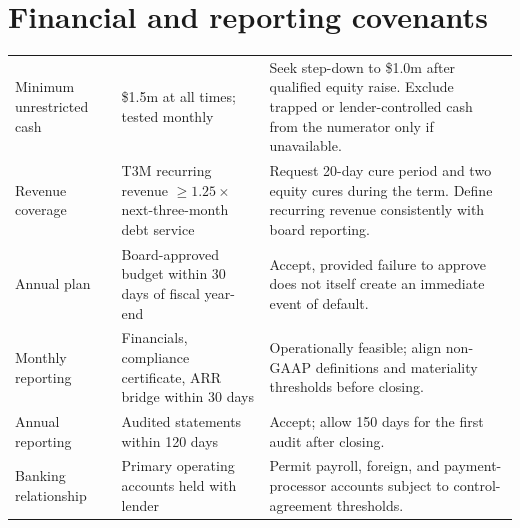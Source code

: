 \section{Financial and reporting covenants}

\begin{tabularx}{\textwidth}{@{}L{0.23\textwidth}L{0.29\textwidth}Y@{}}
\toprule
{}
 &  &  \\
\midrule
Minimum unrestricted cash & \$1.5m at all times; tested monthly & Seek step-down to \$1.0m after qualified equity raise. Exclude trapped or lender-controlled cash from the numerator only if unavailable. \\
Revenue coverage & T3M recurring revenue $\geq 1.25\times$ next-three-month debt service & Request 20-day cure period and two equity cures during the term. Define recurring revenue consistently with board reporting. \\
Annual plan & Board-approved budget within 30 days of fiscal year-end & Accept, provided failure to approve does not itself create an immediate event of default. \\
Monthly reporting & Financials, compliance certificate, ARR bridge within 30 days & Operationally feasible; align non-GAAP definitions and materiality thresholds before closing. \\
Annual reporting & Audited statements within 120 days & Accept; allow 150 days for the first audit after closing. \\
Banking relationship & Primary operating accounts held with lender & Permit payroll, foreign, and payment-processor accounts subject to control-agreement thresholds. \\
\bottomrule
\end{tabularx}
